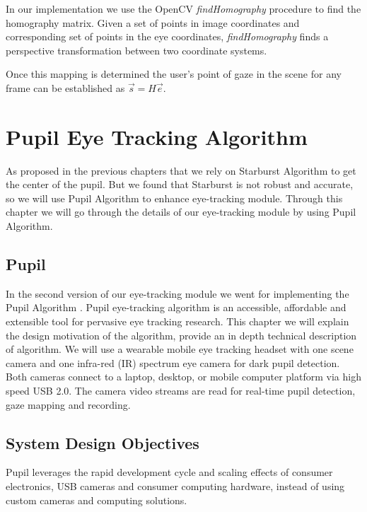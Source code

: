 \documentclass[12pt,fleqn]{book} %
\begin{document}
In our implementation we use the OpenCV \textit{findHomography} procedure to find the homography matrix. Given a set of points in image coordinates and corresponding set of points in the eye coordinates, \textit{findHomography} finds a perspective transformation between two coordinate systems. \bigskip

Once this mapping is determined the user’s point of gaze in the scene for any frame can be established
as $\vec{s} = H \vec{e}$.


\chapter{Pupil Eye Tracking Algorithm}
As proposed in the previous chapters that we rely on Starburst \cite{starburst} Algorithm to get the center of the pupil. But we found that Starburst is not robust and accurate, so we will use Pupil Algorithm to enhance eye-tracking module. Through this chapter we will go through the details of our eye-tracking module by using Pupil Algorithm.

\section{Pupil}
In the second version of our eye-tracking module we went for implementing the Pupil Algorithm \cite{pupil}. Pupil eye-tracking algorithm is an accessible, affordable and extensible tool for pervasive eye tracking research. This chapter we will explain the design motivation of the algorithm, provide an in depth technical description of algorithm. We will use a wearable mobile eye tracking headset with one 
scene camera and one infra-red (IR) spectrum eye camera for dark pupil detection. Both cameras connect to a laptop, desktop, or mobile computer platform via high speed USB 2.0. The camera video streams are read for real-time pupil detection, gaze mapping and recording.  


\section{System Design Objectives}
	Pupil leverages the rapid development cycle and scaling effects of consumer electronics, USB cameras and consumer computing hardware, instead of using custom cameras and computing solutions. \bigskip
\end{document}
